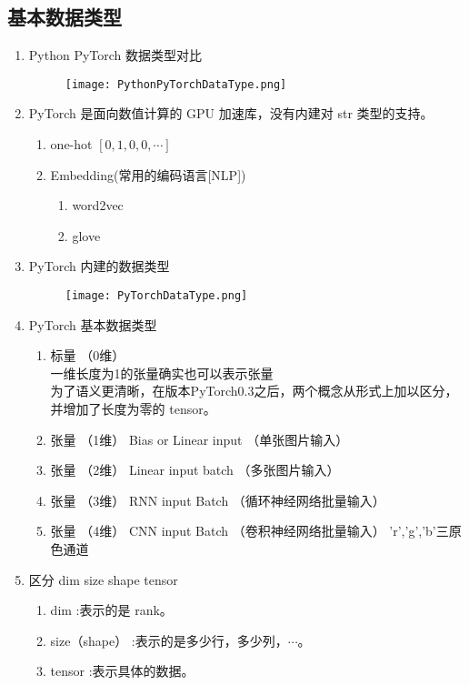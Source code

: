 \subsection{基本数据类型}
\begin{enumerate}
  \item Python PyTorch 数据类型对比
\begin{figure}[!h]
  \centering
  \texttt{[image: PythonPyTorchDataType.png]}
\end{figure}
  \item PyTorch 是面向数值计算的 GPU 加速库，没有内建对 str 类型的支持。
  \begin{enumerate}
    \item one-hot   $[0,1,0,0,\cdots]$
    \item Embedding(常用的编码语言[NLP])
    \begin{enumerate}
      \item word2vec
      \item glove
    \end{enumerate}
  \end{enumerate}
  \item PyTorch 内建的数据类型
\begin{figure}[!h]
  \centering
  \texttt{[image: PyTorchDataType.png]}
\end{figure}
  \item PyTorch 基本数据类型
    \begin{enumerate}
      \item 标量   （0维）    \\ 一维长度为1的张量确实也可以表示张量 \\为了语义更清晰，在版本PyTorch0.3之后，两个概念从形式上加以区分，并增加了长度为零的 tensor。
      \item 张量   （1维）     Bias or Linear input  （单张图片输入）
      \item 张量   （2维）     Linear input batch  （多张图片输入）
      \item 张量   （3维）     RNN input Batch （循环神经网络批量输入） 
      \item 张量   （4维）     CNN input Batch （卷积神经网络批量输入）      'r','g','b'三原色通道
    \end{enumerate}
  \item 区分 dim  size  shape  tensor
  \begin{enumerate}
    \item dim :表示的是 rank。
    \item size（shape） :表示的是多少行，多少列，$\cdots$。
    \item tensor :表示具体的数据。
  \end{enumerate}
\end{enumerate}


